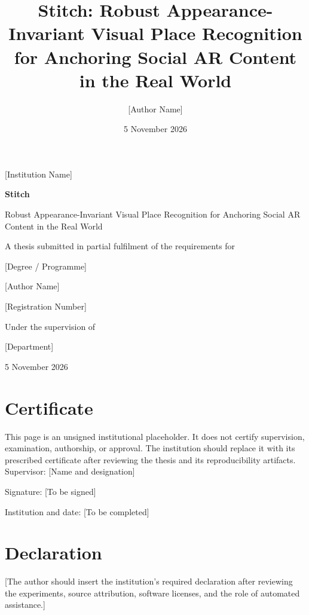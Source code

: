 \documentclass[a4paper,12pt,oneside]{report}
\title{Stitch: Robust Appearance-Invariant Visual Place Recognition for Anchoring Social AR Content in the Real World}
\author{[Author Name]}
\date{5 November 2026}
\begin{document}
\hypersetup{pageanchor=false}
\begin{titlepage}
\centering
{\Large [Institution Name]\par}
\vspace{1.5cm}
{\huge\bfseries Stitch\par}
\vspace{.5cm}
{\LARGE Robust Appearance-Invariant Visual Place Recognition for Anchoring Social AR Content in the Real World\par}
\vspace{1.2cm}
{\large A thesis submitted in partial fulfilment of the requirements for\par}
{\large [Degree / Programme]\par}
\vspace{1cm}
{\Large [Author Name]\par}
{\large [Registration Number]\par}
\vspace{.8cm}
{\large Under the supervision of\par [Supervisor Name]\par}
\vfill
{\large [Department]\par [Institution]\par 5 November 2026\par}
\end{titlepage}
\hypersetup{pageanchor=true}
\chapter*{Certificate}
This page is an unsigned institutional placeholder. It does not certify supervision, examination, authorship, or approval. The institution should replace it with its prescribed certificate after reviewing the thesis and its reproducibility artifacts.
\vspace{2cm}
\noindent Supervisor: [Name and designation]\par
\vspace{1cm}\noindent Signature: [To be signed]\par
\vspace{1cm}\noindent Institution and date: [To be completed]
\chapter*{Declaration}
[The author should insert the institution's required declaration after reviewing the experiments, source attribution, software licenses, and the role of automated assistance.]
\end{document}
